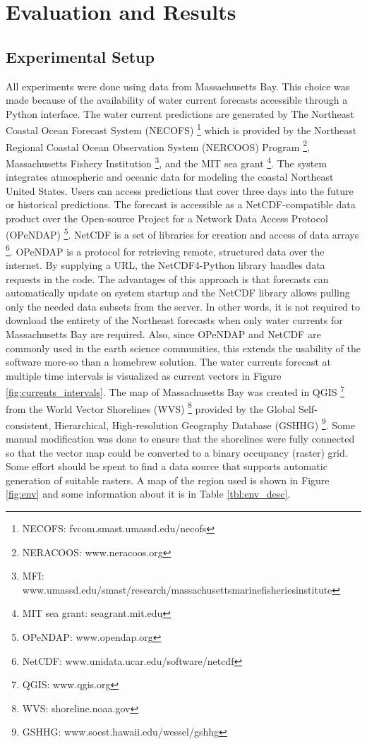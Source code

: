 \documentclass{tamuccthesis}
\begin{document}
\chapter{Evaluation and Results}

\section{Experimental Setup}

All experiments were done using data from Massachusetts Bay. This choice was made because of the availability of water current forecasts accessible through a Python interface. The water current predictions are generated by The Northeast Coastal Ocean Forecast System (NECOFS) \footnote{NECOFS: fvcom.smast.umassd.edu/necofs} which is provided by the Northeast Regional Coastal Ocean Observation System (NERCOOS) Program \footnote{NERACOOS: www.neracoos.org}, Massachusetts Fishery Institution \footnote{MFI: www.umassd.edu/smast/research/massachusettsmarinefisheriesinstitute}, and the MIT sea grant \footnote{MIT sea grant: seagrant.mit.edu}. The system integrates atmospheric and oceanic data for modeling the coastal Northeast United States. Users can access predictions that cover three days into the future or historical predictions. The forecast is accessible as a NetCDF-compatible data product over the Open-source Project for a Network Data Access Protocol (OPeNDAP) \footnote{OPeNDAP: www.opendap.org}. NetCDF is a set of libraries for creation and access of data arrays \footnote{NetCDF: www.unidata.ucar.edu/software/netcdf}. OPeNDAP is a protocol for retrieving remote, structured data over the internet. By supplying a URL, the NetCDF4-Python library handles data requests in the code. The advantages of this approach is that forecasts can automatically update on system startup and the NetCDF library allows pulling only the needed data subsets from the server. In other words, it is not required to download the entirety of the Northeast forecasts when only water currents for Massachusetts Bay are required. Also, since OPeNDAP and NetCDF are commonly used in the earth science communities, this extends the usability of the software more-so than a homebrew solution. The water currents forecast at multiple time intervals is visualized as current vectors in Figure \ref{fig:currents_intervals}. The map of Massachusetts Bay was created in QGIS \footnote{QGIS: www.qgis.org} from the World Vector Shorelines (WVS) \footnote{WVS: shoreline.noaa.gov} provided by the Global Self-consistent, Hierarchical, High-resolution Geography Database (GSHHG) \footnote{GSHHG: www.soest.hawaii.edu/wessel/gshhg}. Some manual modification was done to ensure that the shorelines were fully connected so that the vector map could be converted to a binary occupancy (raster) grid. Some effort should be spent to find a data source that supports automatic generation of suitable rasters. A map of the region used is shown in Figure \ref{fig:env} and some information about it is in Table \ref{tbl:env_desc}.
\end{document}
